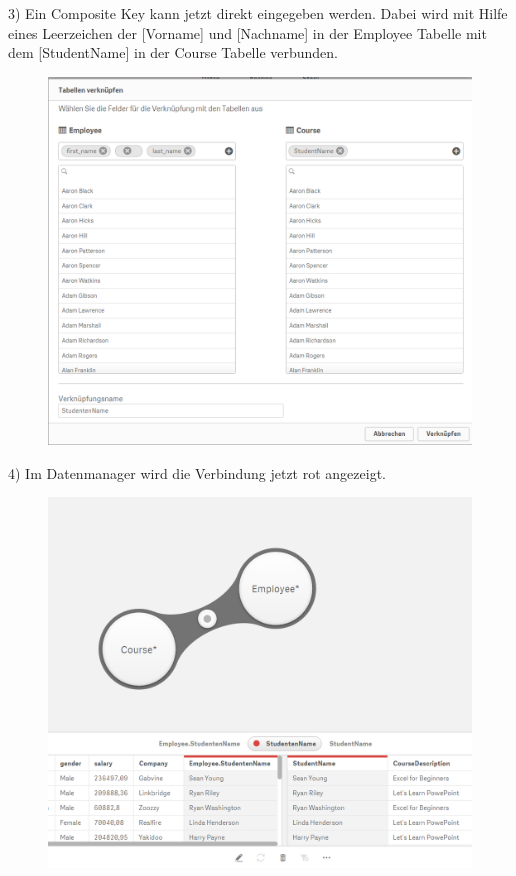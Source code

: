 3) Ein Composite Key kann jetzt direkt eingegeben werden. Dabei wird mit Hilfe eines Leerzeichen der [Vorname] und [Nachname] in der Employee Tabelle mit dem [StudentName] in der Course Tabelle verbunden.
\begin{figure}[H]
	\centering
	\includegraphics[scale = 0.3]{attachment/chapter_3/Scc021}
	\caption{}
	\label{fig:Scc021}
\end{figure}

4) Im Datenmanager wird die Verbindung jetzt rot angezeigt.
\begin{figure}[H]
	\centering
	\includegraphics[scale = 0.3]{attachment/chapter_3/Scc022}
	\caption{}
	\label{fig:Scc022}
\end{figure}



